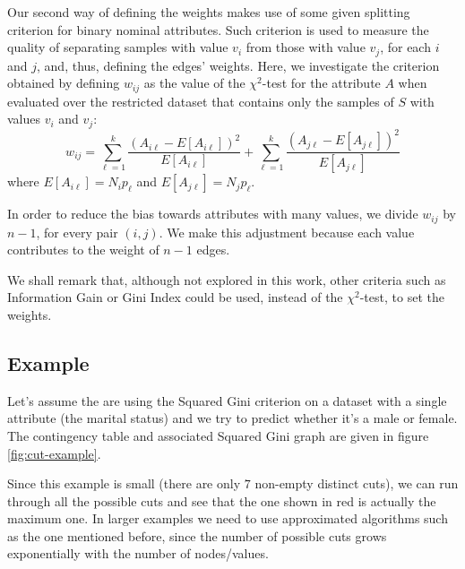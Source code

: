 Our second way of defining the weights makes use of some 
given splitting criterion 
for  binary nominal attributes. 
Such  criterion is used to measure the quality of separating samples with value $v_i$ from those with value $v_j$,
for each $i$ and $j$, and, thus, defining the edges' weights.
Here, we investigate the criterion obtained by 
defining $w_{ij}$ as the value of the $\chi^2$-test
for the attribute $A$ when  evaluated over the restricted dataset 
that contains only the samples of $S$ with values $v_i$ and $v_j$:
$$w_{ij}=  \sum_{\ell=1}^k \frac{(A_{i \ell}-E[A_{i \ell}] )^2}{E[A_{ i \ell}]}
+ \sum_{\ell=1}^k \frac{(A_{j \ell}-E[A_{j \ell}] )^2}{E[A_{ j \ell}]}
$$
where $E[A_{i \ell }]=N_i p_{\ell}$
and $E[A_{j \ell }]=N_j p_{\ell} $.

In order to reduce the bias towards attributes with many values, we divide 
$w_{ij}$ by  $n-1$, for every pair $(i,j)$. We make this adjustment  because each value contributes
to the weight of $n-1$ edges.

We shall remark that, although not explored in this work,
other criteria such as Information Gain or Gini Index
could be used, instead of the $\chi^2$-test, to
set the weights.


\subsection{Example}

Let's assume the are using the Squared Gini criterion on a dataset with a single attribute (the marital status) and we try to predict whether it's a male or female. The contingency table and associated Squared Gini graph are given in figure \ref{fig:cut-example}.

Since this example is small (there are only $7$ non-empty distinct cuts), we can run through all the possible cuts and see that the one shown in red is actually the maximum one. In larger examples we need to use approximated algorithms such as the one mentioned before, since the number of possible cuts grows exponentially with the number of nodes/values.

